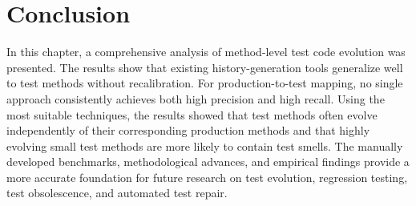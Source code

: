 \section{Conclusion}
In this chapter, a comprehensive analysis of method-level test code evolution was presented. The results show that existing history-generation tools generalize well to test methods without recalibration. For production-to-test mapping, no single approach consistently achieves both high precision and high recall. Using the most suitable techniques, the results showed that test methods often evolve independently of their corresponding production methods and that highly evolving small test methods are more likely to contain test smells. The manually developed benchmarks, methodological advances, and empirical findings provide a more accurate foundation for future research on test evolution, regression testing, test obsolescence, and automated test repair.
